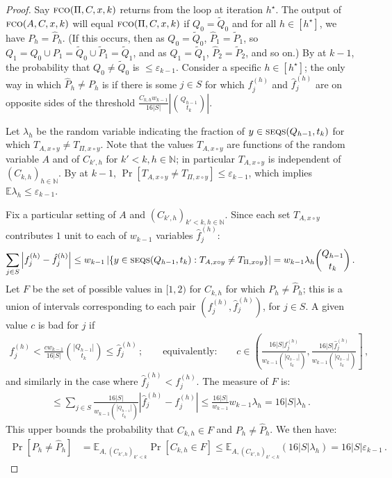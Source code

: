 \documentclass[10pt,a4paper]{article}
\theoremstyle{definition}
\theoremstyle{remark}
\newcommand{\EE}{\mathbb{E}}
\newcommand{\NN}{\mathbb{N}}
\newcommand{\tP}{\widetilde{P}}
\newcommand{\tQ}{\widetilde{Q}}
\newcommand{\hP}{\hat{P}}
\newcommand{\hf}{\hat{f}}
\let\epsilon\varepsilon
\newcommand{\fco}{\textsc{fco}\xspace}
\newcommand{\concat}{\mathbin{\circ}}       %
\newcommand{\SSD}[2]{\textsc{seqs}(#1,#2)}  %
\begin{document}
\begin{itemize}
\begin{itemize}
\begin{proof}
  Say $\fco(\Pi, C, x, k)$ returns from the loop at iteration $h^\star$. The output of
  $\fco(A, C, x, k)$ will equal $\fco(\Pi, C, x, k)$ if $Q_0 = \tQ_0$ and for all $h \in [h^\star]$,
  we have $P_h = \hP_h$. (If this occurs, then as $Q_0 = \tQ_0$, $\hP_1 = \tP_1$, so
  $Q_1 = Q_0 \cup P_1 = \tQ_0 \cup \tP_1 = \tQ_1$, and as $Q_1 = \tQ_1$, $\hP_2 = \tP_2$, and so on.)  By  at $k-1$, the probability that
  $Q_0 \ne \tQ_0$ is $\le \epsilon_{k-1}$. Consider a specific $h \in [h^\star]$;
  the only way in which $\hP_h \ne P_h$ is if there is some $j \in S$ for which $f_j^{(h)}$ and $\hf_j^{(h)}$
  are on opposite sides of the threshold $\frac{C_{k,h} w_{k-1}}{16 |S|} |\binom{Q_{h-1}}{t_k}|$.
  
  Let $\lambda_{h}$ be the random variable indicating the fraction of $y \in \SSD{Q_{h-1}}{t_k}$
  for which $T_{A,x \concat y} \ne T_{\Pi,x \concat y}$. Note that the values $T_{A,x \concat y}$ are functions of
  the random variable $A$ and of $C_{k',h}$ for $k' < k, h \in \NN$; in particular $T_{A,x\circ y}$ is independent of $(C_{k,h})_{h \in \NN}$. By  at $k-1$,
  $\Pr[T_{A,x\circ y} \ne T_{\Pi,x\circ y}] \le \epsilon_{k-1}$, which implies $\EE \lambda_h \le \epsilon_{k-1}$.
  
  Fix a particular setting of $A$ and $(C_{k',h})_{k' < k, h \in \NN}$. Since each set $T_{A,x\circ y}$
  contributes $1$ unit to each of $w_{k-1}$ variables $\hf_j^{(h)}$:
  \begin{align*}
    \sum_{j \in S} \left|f_j^{(h)} - \hf_j^{(h)}\right| \le w_{k-1} \left|\left\{y \in \SSD{Q_{h-1}}{t_k} : T_{A,x \concat y} \ne T_{\Pi,x\circ y}\right\}\right| = w_{k-1} \lambda_h \binom{Q_{h-1}}{t_k} \,.
  \end{align*}
  Let $F$ be the set of possible values in $[1,2)$ for $C_{k,h}$ for which $P_h \ne \hP_h$;
  this is a union of intervals corresponding to each pair $\left(f_j^{(h)}, \hf_j^{(h)}\right)$,
  for $j \in S$. A given value $c$ is bad for $j$ if 
  \begin{align*}
    f_j^{(h)} < \frac{c w_{k-1}}{16 |S|} \binom{|Q_{h-1}|}{t_k} \le \hf_j^{(h)} \,; \qquad \text{equivalently:} \qquad c \in \left(\frac{16 |S| f_j^{(h)} }{w_{k-1} \binom{|Q_{h-1}|}{t_k}}, \frac{16 |S| \hf_j^{(h)}}{w_{k-1} \binom{|Q_{h-1}|}{t_k}}\right] \,,
  \end{align*}
  and similarly in the case where $\hf_j^{(h)} < f_j^{(h)}$. The measure of $F$ is:
  \begin{align*}
    \le \sum_{j \in S} \frac{16 |S|}{w_{k-1} \binom{|Q_{h-1}|}{t_k}} |\hf_j^{(h)} - f_j^{(h)}| \le \frac{16 |S|}{w_{k-1}} w_{k-1} \lambda_h = 16 |S| \lambda_h \,.
  \end{align*}
  This upper bounds the probability that $C_{k,h} \in F$ and $P_h \ne \hP_h$. We then have:
  \begin{align*}
    \Pr[P_h \ne \hP_h] &= \EE_{A, (C_{k',h})_{k' < k}} \Pr[ C_{k,h} \in F ] 
      \le \EE_{A, (C_{k',h})_{k' < k}} (16 |S| \lambda_h) = 16 |S| \epsilon_{k-1} \,.
  \end{align*}
  

\end{proof}
\end{itemize}
\end{itemize}
\end{document}

